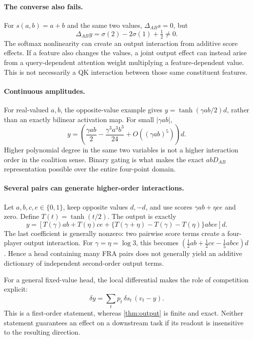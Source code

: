 \documentclass[11pt]{article}
\newcommand{\pairdiff}{\Delta_{AB}}
\theoremstyle{plain}
\theoremstyle{definition}
\theoremstyle{remark}
\begin{document}
\paragraph{The converse also fails.}
For $s(a,b)=a+b$ and the same two values, $\pairdiff s=0$, but
\[
 \pairdiff y=\sigma(2)-2\sigma(1)+\tfrac12\ne0.
\]
The softmax nonlinearity can create an output interaction from additive score effects. If a feature also changes the values, a joint output effect can instead arise from a query-dependent attention weight multiplying a feature-dependent value. This is not necessarily a QK interaction between those same constituent features.

\paragraph{Continuous amplitudes.}
For real-valued $a,b$, the opposite-value example gives $y=\tanh(\gamma ab/2)d$, rather than an exactly bilinear activation map. For small $|\gamma ab|$,
\[
 y=\left(\frac{\gamma ab}{2}-\frac{\gamma^3a^3b^3}{24}
       +O((\gamma ab)^5)\right)d.
\]
Higher polynomial degree in the same two variables is not a higher interaction order in the coalition sense. Binary gating is what makes the exact $abD_{AB}$ representation possible over the entire four-point domain.

\paragraph{Several pairs can generate higher-order interactions.}
Let $a,b,c,e\in\{0,1\}$, keep opposite values $d,-d$, and use scores $\gamma ab+\eta ce$ and zero. Define $T(t)=\tanh(t/2)$. The output is exactly
\begin{equation}
 y=\left[T(\gamma)ab+T(\eta)ce
  +\{T(\gamma+\eta)-T(\gamma)-T(\eta)\}abce\right]d.
\label{eq:four-way}
\end{equation}
The last coefficient is generally nonzero: two pairwise score terms create a four-player output interaction. For $\gamma=\eta=\log3$, this becomes $(\tfrac12 ab+\tfrac12 ce-\tfrac15 abce)d$. Hence a head containing many FRA pairs does not generally yield an additive dictionary of independent second-order output terms.

For a general fixed-value head, the local differential makes the role of competition explicit:
\begin{equation}
 \delta y=\sum_t p_t\,\delta s_t\,(v_t-y).
\label{eq:jacobian}
\end{equation}
This is a first-order statement, whereas \cref{thm:output} is finite and exact. Neither statement guarantees an effect on a downstream task if its readout is insensitive to the resulting direction.
\end{document}
